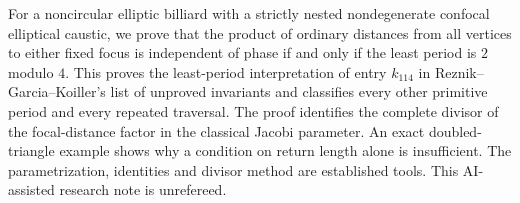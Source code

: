 
For a noncircular elliptic billiard with a strictly nested nondegenerate
confocal elliptical caustic, we prove that the product of ordinary distances
from all vertices to either fixed focus is independent of phase if and only
if the least period is \(2\) modulo \(4\).
This proves the least-period interpretation of entry \(k_{114}\) in
Reznik--Garcia--Koiller's list of unproved invariants and classifies every
other primitive period and every repeated traversal.
The proof identifies the complete divisor of the focal-distance factor
in the classical Jacobi parameter. An exact doubled-triangle example
shows why a condition on return length alone is insufficient.
The parametrization, identities and divisor method are established tools.
This AI-assisted research note is unrefereed.
